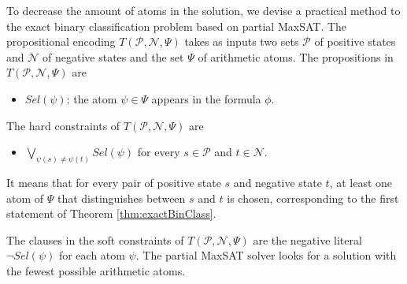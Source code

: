 \documentclass[review]{elsarticle}
\newcommand{\positiveSet}{\mathcal{P}}
\newcommand{\negativeSet}{\mathcal{N}}
\newcommand{\featureSet}{\Psi}
\begin{document}
	To decrease the amount of atoms in the solution, we devise a practical method to the exact binary classification problem based on partial MaxSAT.
	The propositional encoding $T(\positiveSet, \negativeSet, \featureSet)$ takes as inputs two sets $\positiveSet$ of positive states and $\negativeSet$ of negative states and the set $\featureSet$ of arithmetic atoms.
	The propositions in $T(\positiveSet, \negativeSet, \featureSet)$ are 
	\begin{itemize}
		\item $Sel(\psi)$: the atom $\psi \in \Psi$ appears in the formula $\phi$.
	\end{itemize}
	
	The hard constraints of $T(\positiveSet, \negativeSet, \featureSet)$ are 
	\begin{itemize}
		\item $\bigvee_{\psi(s) \neq \psi(t)} Sel(\psi)$ for every $s \in \positiveSet$ and $t \in \negativeSet$.
	\end{itemize}
	It means that for every pair of positive state $s$ and negative state $t$, at least one atom of $\featureSet$ that distinguishes between $s$ and $t$ is chosen, corresponding to the first statement of Theorem \ref{thm:exactBinClass}.
	
	The clauses in the soft constraints of $T(\positiveSet, \negativeSet, \featureSet)$ are the negative literal $\neg Sel(\psi)$ for each atom $\psi$.
	The partial MaxSAT solver looks for a solution with the fewest possible arithmetic atoms.
	
\end{document}

